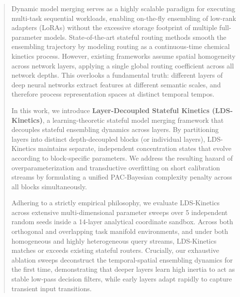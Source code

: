 \begin{abstract}
Dynamic model merging serves as a highly scalable paradigm for executing multi-task sequential workloads, enabling on-the-fly ensembling of low-rank adapters (LoRAs) without the excessive storage footprint of multiple full-parameter models. State-of-the-art stateful routing methods smooth the ensembling trajectory by modeling routing as a continuous-time chemical kinetics process. However, existing frameworks assume spatial homogeneity across network layers, applying a single global routing coefficient across all network depths. This overlooks a fundamental truth: different layers of deep neural networks extract features at different semantic scales, and therefore process representation spaces at distinct temporal tempos. 

In this work, we introduce \textbf{Layer-Decoupled Stateful Kinetics (LDS-Kinetics)}, a learning-theoretic stateful model merging framework that decouples stateful ensembling dynamics across layers. By partitioning layers into distinct depth-decoupled blocks (or individual layers), LDS-Kinetics maintains separate, independent concentration states that evolve according to block-specific parameters. We address the resulting hazard of overparameterization and transductive overfitting on short calibration streams by formulating a unified PAC-Bayesian complexity penalty across all blocks simultaneously. 

Adhering to a strictly empirical philosophy, we evaluate LDS-Kinetics across extensive multi-dimensional parameter sweeps over 5 independent random seeds inside a 14-layer analytical coordinate sandbox. Across both orthogonal and overlapping task manifold environments, and under both homogeneous and highly heterogeneous query streams, LDS-Kinetics matches or exceeds existing stateful routers. Crucially, our exhaustive ablation sweeps deconstruct the temporal-spatial ensembling dynamics for the first time, demonstrating that deeper layers learn high inertia to act as stable low-pass decision filters, while early layers adapt rapidly to capture transient input transitions.
\end{abstract}
